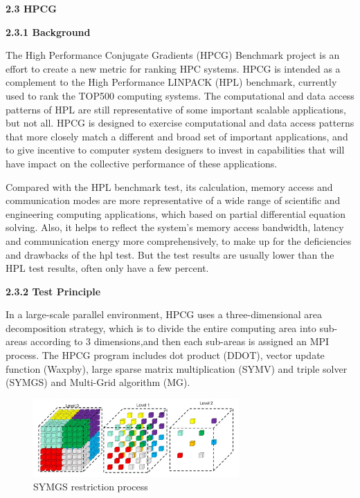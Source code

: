 \documentclass[a4paper,12pt]{article}
\begin{document}
\textbf{2.3 HPCG}

\textbf{2.3.1 Background}

The High Performance Conjugate Gradients (HPCG) Benchmark project is an effort to create a new metric for ranking HPC systems. HPCG is intended as a complement to the High Performance LINPACK (HPL) benchmark, currently used to rank the TOP500 computing systems. The computational and data access patterns of HPL are still representative of some important scalable applications, but not all. HPCG is designed to exercise computational and data access patterns that more closely match a different and broad set of important applications, and to give incentive to computer system designers to invest in capabilities that will have impact on the collective performance of these applications.

Compared with the HPL benchmark test, its calculation, memory access and communication modes are more representative of a wide range of scientific and engineering computing applications, which based on partial differential equation solving. Also, it helps to reflect the system's memory access bandwidth, latency and communication energy more comprehensively, to make up for the deficiencies and drawbacks of the hpl test. But the test results are usually lower than the HPL test results, often only have a few percent.

\textbf{2.3.2 Test Principle}

In a large-scale parallel environment, HPCG uses a three-dimensional area decomposition strategy, which is to divide the entire computing area into sub-areas according to 3 dimensions,and then each sub-areas is assigned an MPI process. The HPCG program includes dot product (DDOT), vector update function (Waxpby), large sparse matrix multiplication (SYMV) and triple solver (SYMGS) and Multi-Grid algorithm (MG).

\begin{figure}[H]
    \centering
    \includegraphics[width=0.7\textwidth]{SYMGS_restriction_process.png}
    \caption{SYMGS restriction process}
    \label{fig:symgs_restriction}
\end{figure}
\end{document}

